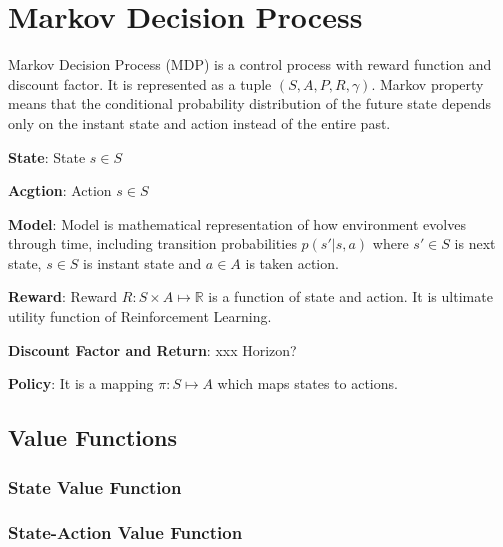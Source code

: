 \section{Markov Decision Process}
\label{sec:mdp}

Markov Decision Process (MDP) is a control process with reward function and discount factor. It is represented as a tuple $(S,A,P,R,\gamma)$. Markov property means that the conditional probability distribution of the future state depends only on the instant state and action instead of the entire past. 

\textbf{State}: State $s \in S$

\textbf{Acgtion}: Action $s \in S$

\textbf{Model}: Model is mathematical representation of how environment evolves through time, including transition probabilities $p(s'|s,a)$ where $s' \in S$ is next state, $s \in S$ is instant state and $a \in A$ is taken action.

\textbf{Reward}: Reward $R \colon S \times A \mapsto \mathbb{R}$ is a function of state and action. It is ultimate utility function of Reinforcement Learning.

\textbf{Discount Factor and Return}: xxx Horizon?

\textbf{Policy}: It is a mapping $\pi \colon S \mapsto A$ which maps states to actions. 

\subsection{Value Functions}

\subsubsection{State Value Function}

\subsubsection{State-Action Value Function}
